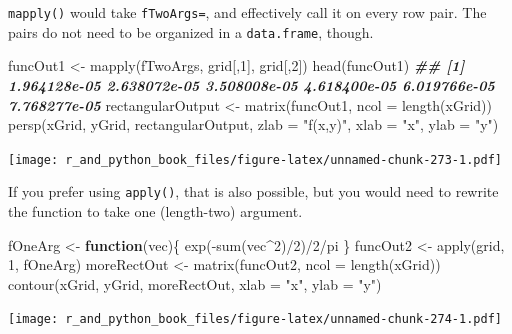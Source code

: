 \documentclass[
  12pt,
  krantz2]{krantz}
\makeatletter
\newenvironment{Shaded}{\begin{snugshade}}{\end{snugshade}}
\newcommand{\AttributeTok}[1]{\textcolor[rgb]{0.61,0.61,0.61}{#1}}
\newcommand{\ControlFlowTok}[1]{\textcolor[rgb]{0.27,0.27,0.27}{\textbf{#1}}}
\newcommand{\DecValTok}[1]{\textcolor[rgb]{0.06,0.06,0.06}{#1}}
\newcommand{\DocumentationTok}[1]{\textcolor[rgb]{0.37,0.37,0.37}{\textbf{\textit{#1}}}}
\newcommand{\FunctionTok}[1]{\textcolor[rgb]{0,0,0}{#1}}
\newcommand{\NormalTok}[1]{#1}
\newcommand{\OtherTok}[1]{\textcolor[rgb]{0.37,0.37,0.37}{#1}}
\newcommand{\SpecialCharTok}[1]{\textcolor[rgb]{0,0,0}{#1}}
\newcommand{\StringTok}[1]{\textcolor[rgb]{0.5,0.5,0.5}{#1}}
\newenvironment{kframe}{%
\medskip{}
\setlength{\fboxsep}{.8em}
 \def\at@end@of@kframe{}%
 \ifinner\ifhmode%
  \def\at@end@of@kframe{\end{minipage}}%
  \begin{minipage}{\columnwidth}%
 \fi\fi%
 \def\FrameCommand##1{\hskip\@totalleftmargin \hskip-\fboxsep
 \colorbox{shadecolor}{##1}\hskip-\fboxsep
     \hskip-\linewidth \hskip-\@totalleftmargin \hskip\columnwidth}%
 \MakeFramed {\advance\hsize-\width
   \@totalleftmargin\z@ \linewidth\hsize
   \@setminipage}}%
 {\par\unskip\endMakeFramed%
 \at@end@of@kframe}
\renewenvironment{Shaded}{\begin{kframe}}{\end{kframe}}
\makeatother
\begin{document}
\texttt{mapply()} would take \texttt{fTwoArgs=}, and effectively call it on every row pair. The pairs do not need to be organized in a \texttt{data.frame}, though.

\begin{Shaded}
\begin{Highlighting}[]
\NormalTok{funcOut1 }\OtherTok{\textless{}{-}} \FunctionTok{mapply}\NormalTok{(fTwoArgs, grid[,}\DecValTok{1}\NormalTok{], grid[,}\DecValTok{2}\NormalTok{])}
\FunctionTok{head}\NormalTok{(funcOut1)}
\DocumentationTok{\#\# [1] 1.964128e{-}05 2.638072e{-}05 3.508008e{-}05 4.618400e{-}05 6.019766e{-}05 7.768277e{-}05}
\NormalTok{rectangularOutput }\OtherTok{\textless{}{-}} \FunctionTok{matrix}\NormalTok{(funcOut1, }\AttributeTok{ncol =} \FunctionTok{length}\NormalTok{(xGrid))}
\FunctionTok{persp}\NormalTok{(xGrid, yGrid, rectangularOutput, }
      \AttributeTok{zlab =} \StringTok{"f(x,y)"}\NormalTok{, }\AttributeTok{xlab =} \StringTok{"x"}\NormalTok{, }\AttributeTok{ylab =} \StringTok{"y"}\NormalTok{)}
\end{Highlighting}
\end{Shaded}

\texttt{[image: r\_and\_python\_book\_files/figure-latex/unnamed-chunk-273-1.pdf]}

If you prefer using \texttt{apply()}, that is also possible, but you would need to rewrite the function to take one (length-two) argument.

\begin{Shaded}
\begin{Highlighting}[]
\NormalTok{fOneArg }\OtherTok{\textless{}{-}} \ControlFlowTok{function}\NormalTok{(vec)\{}
  \FunctionTok{exp}\NormalTok{(}\SpecialCharTok{{-}}\FunctionTok{sum}\NormalTok{(vec}\SpecialCharTok{\^{}}\DecValTok{2}\NormalTok{)}\SpecialCharTok{/}\DecValTok{2}\NormalTok{)}\SpecialCharTok{/}\DecValTok{2}\SpecialCharTok{/}\NormalTok{pi}
\NormalTok{\} }
\NormalTok{funcOut2 }\OtherTok{\textless{}{-}} \FunctionTok{apply}\NormalTok{(grid, }\DecValTok{1}\NormalTok{, fOneArg)}
\NormalTok{moreRectOut }\OtherTok{\textless{}{-}} \FunctionTok{matrix}\NormalTok{(funcOut2, }\AttributeTok{ncol =} \FunctionTok{length}\NormalTok{(xGrid))}
\FunctionTok{contour}\NormalTok{(xGrid, yGrid, moreRectOut, }\AttributeTok{xlab =} \StringTok{"x"}\NormalTok{, }\AttributeTok{ylab =} \StringTok{"y"}\NormalTok{)}
\end{Highlighting}
\end{Shaded}

\texttt{[image: r\_and\_python\_book\_files/figure-latex/unnamed-chunk-274-1.pdf]}
\end{document}
